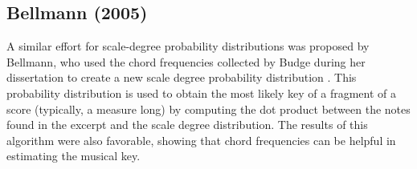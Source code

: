 

\subsection{Bellmann (2005)}

A similar effort for scale-degree probability distributions was proposed by Bellmann, who used the chord frequencies collected by Budge during her dissertation \cite{budge1943study} to create a new scale degree probability distribution \cite{bellmann2006about}. This probability distribution is used to obtain the most likely key of a fragment of a score (typically, a measure long) by computing the dot product between the notes found in the excerpt and the scale degree distribution. The results of this algorithm were also favorable, showing that chord frequencies can be helpful in estimating the musical key.




